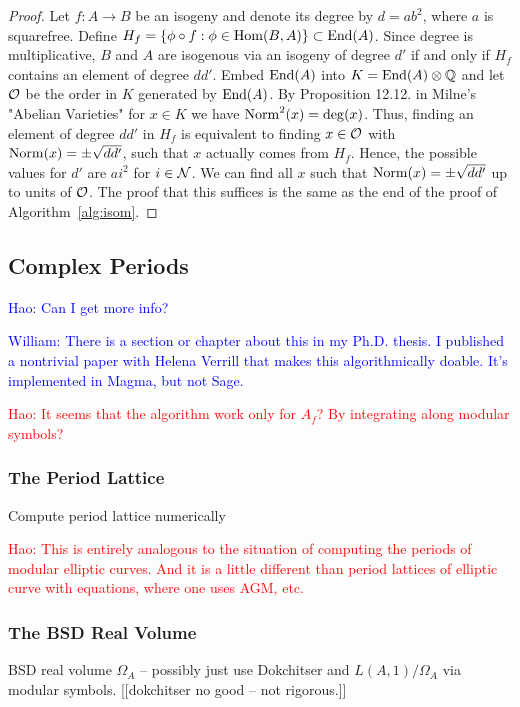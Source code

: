 \documentclass{article}
\newcommand{\Hao}[1]{\textcolor{blue}{\textsf{Hao: #1}}}
\newcommand{\wstein}[1]{\textcolor{blue}{\textsf{William: #1}}}
\newcommand{\Haonew}[1]{\textcolor{red}{\textsf{Hao: #1}}}
\begin{document}
\begin{proof}
Let $f:A \to B$ be an isogeny and denote its degree by $d = ab^2$, where $a$ is
squarefree. Define $H_f = \{\phi \circ f: \phi \in
\operatorname{Hom}(B,A)\} \subset \operatorname{End}(A)$. Since degree is multiplicative, $B$ and $A$ are
isogenous via an isogeny of degree $d'$ if and only if $H_f$ contains an element
of degree $d d'$. Embed
$\operatorname{End}(A)$ into $K = \operatorname{End}(A) \otimes \mathbb{Q}$ and let $\mathcal{O}$ be the order in $K$
generated by $\operatorname{End}(A)$. By Proposition 12.12. in Milne's "Abelian Varieties"
for $x \in K$ we have $\operatorname{Norm}^2(x) = \deg(x)$. Thus, finding an element of
degree $dd'$ in $H_f$ is equivalent to finding $x \in \mathcal{O}$ with $\operatorname{Norm}(x) =
\pm \sqrt{dd'}$, such that $x$ actually comes from $H_f$. Hence, the possible
values for $d'$ are $a i^2$ for $i \in \mathcal{N}$. We can find all $x$
such that $\operatorname{Norm}(x) = \pm \sqrt{dd'}$ up to units of $\mathcal{O}$.
The proof that this suffices is the same as the end of the
proof of Algorithm~\ref{alg:isom}.
\end{proof}


\subsection{Complex Periods}

\Hao{Can I get more info?}

\wstein{There is a section or chapter about this in my Ph.D. thesis.
I published a nontrivial paper with Helena Verrill that makes this algorithmically doable.  It's implemented in Magma, but not Sage.}

\Haonew{It seems that the algorithm work only for $A_f$? By integrating along modular symbols?}

\subsubsection{The Period Lattice}
Compute period lattice numerically

\Haonew{This is entirely analogous to the situation of computing the periods of modular elliptic curves. And it is a little different than period lattices of elliptic curve with equations, where one uses AGM, etc.}

\subsubsection{The BSD Real Volume}
BSD real volume $\Omega_A$ -- possibly just use Dokchitser and
$L(A,1)/\Omega_A$ via modular symbols.  [[dokchitser no good -- not rigorous.]]
\end{document}
